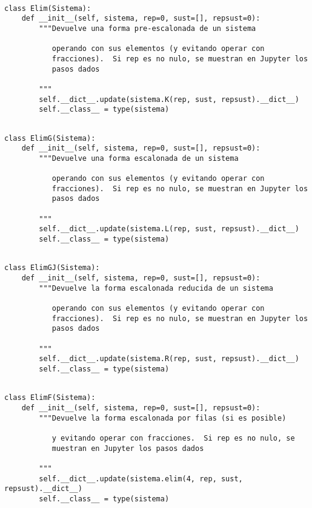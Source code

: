 \documentclass[11pt]{report}
\begin{document}
\begin{verbatim}

class Elim(Sistema):
    def __init__(self, sistema, rep=0, sust=[], repsust=0):
        """Devuelve una forma pre-escalonada de un sistema

           operando con sus elementos (y evitando operar con
           fracciones).  Si rep es no nulo, se muestran en Jupyter los
           pasos dados

        """
        self.__dict__.update(sistema.K(rep, sust, repsust).__dict__)
        self.__class__ = type(sistema)

\end{verbatim}


\begin{verbatim}

class ElimG(Sistema):
    def __init__(self, sistema, rep=0, sust=[], repsust=0):
        """Devuelve una forma escalonada de un sistema

           operando con sus elementos (y evitando operar con
           fracciones).  Si rep es no nulo, se muestran en Jupyter los
           pasos dados

        """
        self.__dict__.update(sistema.L(rep, sust, repsust).__dict__)
        self.__class__ = type(sistema)

\end{verbatim}


\begin{verbatim}

class ElimGJ(Sistema):
    def __init__(self, sistema, rep=0, sust=[], repsust=0):
        """Devuelve la forma escalonada reducida de un sistema

           operando con sus elementos (y evitando operar con
           fracciones).  Si rep es no nulo, se muestran en Jupyter los
           pasos dados

        """
        self.__dict__.update(sistema.R(rep, sust, repsust).__dict__)
        self.__class__ = type(sistema)

\end{verbatim}


\begin{verbatim}

class ElimF(Sistema):
    def __init__(self, sistema, rep=0, sust=[], repsust=0):
        """Devuelve la forma escalonada por filas (si es posible)

           y evitando operar con fracciones.  Si rep es no nulo, se
           muestran en Jupyter los pasos dados

        """        
        self.__dict__.update(sistema.elim(4, rep, sust, repsust).__dict__)
        self.__class__ = type(sistema)

\end{verbatim}
\end{document}
